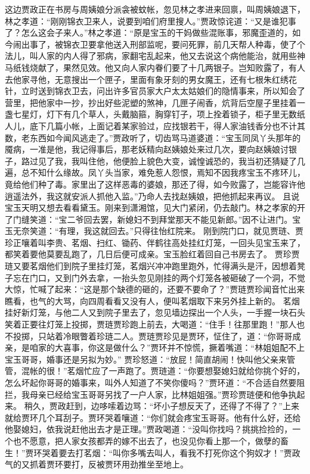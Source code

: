 \documentclass[12pt,oneside]{book}
\begin{document}
这边贾政正在书房与周姨娘分派衾被蚊帐，忽见林之孝进来回禀，叫周姨娘退下，林之孝道：“刚刚锦衣卫来人，说要到咱们府里搜人。”贾政惊诧道：“又是谁犯事了？怎么这会子来人。”林之孝道：“原是宝玉的干妈做些混账事，邪魔歪道的，如今闹出事了，被锦衣卫要拿他送入刑部监呢，要问死罪，前几天帮人种毒，使了个法儿，叫人家的内人得了邪病，家翻宅乱起来，他又去说这个病他能治，就用些神马纸钱烧献了，果然见效。他又向人家内眷们要了十几两银子。岂知败露了，有人去他家寻他，无意搜出一个匣子，里面有象牙刻的男女魔王，还有七根朱红绣花针，立时送到锦衣卫去，问出许多官员家大户太太姑娘们的隐情事来，所以知会了营里，把他家中一抄，抄出好些泥塑的煞神，几匣子闹香，炕背后空屋子里挂着一盏七星灯，灯下有几个草人，头戴脑箍，胸穿钉子，项上拴着锁子，柜子里无数纸人儿，底下几篇小帐，上面记着某家验过，应找银若干，得人家油钱香分也不计其数，老东西如今闻风逃走了。”贾政听了，切齿骂马道婆道：“宝玉同凤丫头那年的魇病，一准是他，我记得事后，那老妖精向赵姨娘处来过几次，要向赵姨娘讨银子，路过见了我，我叫住他，他便脸上貌色大变，诚惶诚恐的，我当初还猜疑了几遍，总不知什么缘故。凤丫头当家，难免惹人怨恨，焉知不因我疼宝玉不疼环儿，竟给他们种了毒。家里出了这样恶毒的婆娘，那还了得，如今败露了，岂能容许他逍遥法外，我这就安派人抓他入监。”乃命人去找赵姨娘，把他抓起来再议。
且说宝玉天明又想去看看黛玉。刚来到潇湘馆，见大门紧闭，仍去敲门。林之孝家的开了门缝笑道：“宝二爷回去罢，新媳妇不到拜堂那天不能见新郎。”因不让进门。宝玉无奈笑道：“有理，我这就回去。”只得往怡红院来。
刚到院门口，就见贾琏、贾珍正嚷着叫李贵、茗烟、扫红、锄药、伴鹤往高处挂红灯笼，一回头见宝玉来了，都笑着要他莫要乱跑了，几日后便可成亲。宝玉脸红着回自己书房去了。
贾珍贾琏又要茗烟他们到院子里挂灯笼，茗烟兴冲冲跑里跑外，忙得满头是汗，因想着凳子忘在门口，又到门外去拿，一抬头忽见刚挂的两个灯笼各被砸破了一个洞，不觉大惊，忙喊了起来：“这是那个缺德的砸的，还要不要命了？”贾琏贾珍闻音忙出来瞧看，也气的大骂，向四周看看又没有人，便叫茗烟取下来另外挂上新的。
茗烟挂好新灯笼，与他二人又到院子里去了，忽见墙边探出一个人头，一手握一块石头笑着正要往灯笼上投掷，贾琏贾珍跑上前去，大喝道：“住手！往那里跑！”那人也不投掷，只站着冷眼瞥着珍琏二人。贾琏贾珍见是贾环，怔住了，道：“你哥哥成亲，是咱家的大喜事，你这是做什么？”贾环并不惊慌，撅着嘴道：“林姐姐配不上宝玉哥哥，婚事还是另拟为妙。”
贾珍怒道：“放屁！简直胡闹！快叫他父亲来管管，混帐的很！”茗烟忙应了一声跑了。贾琏道：“你要想娶媳妇就给你挑个好的，怎么坏起你哥哥的婚事来，叫外人知道了不笑你傻吗？”贾环道：“不合适自然要阻拦，我母亲已经给宝玉哥哥另找了一户人家，比林姐姐强。”贾珍贾琏便和他争执起来。
稍久，贾政赶到，边哆嗦着边骂：“坏小子想反天了，还得了不得了？”上来就给贾环几个耳刮子。贾环哭着嚷道：“你们就会疼宝玉哥哥。他有什么好，还给他娶媳妇，依我说赶他出去才是正理。”贾政喝道：“没叫你找吗？挑挑捡捡的，一个也不愿意，把人家女孩都弄的嫁不出去了，也没见你看上那一个，做孽的畜生！”贾环哭着要去打茗烟：“叫你多嘴去叫人，看我不打死你这个狗奴才！”贾政气的又抓着贾环要打，反被贾环用劲推坐至地上。
\end{document}
